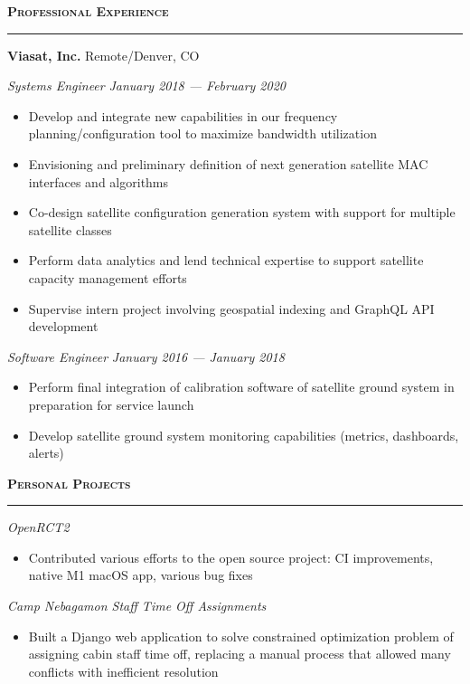 \documentclass[10pt,letterpaper,hidelinks]{article}
\newcommand*{\seriffont}{\fontfamily{yv1}\selectfont}
\newenvironment{resumeSection}[1]{
{\Large \textbf{\textsc{#1}}}
\vspace{0.25em}
\hrule
\vspace{0.5em}
}{

}
\newenvironment{employer}[2]{
{\large \textbf{#1} \hfill #2} \newline
}{
\vspace{0.5em}
}
\newenvironment{position}[2]{
{\large \emph{#1} \hfill \emph{#2}}
\seriffont 
\begin{itemize}[noitemsep,topsep=0pt]
}{
\end{itemize}
\vspace{0.5em}
}
\begin{document}
\begin{resumeSection}{Professional Experience}
\begin{employer}{Viasat, Inc.}{Remote/Denver, CO}
\begin{position}{Systems Engineer}{January 2018 --- February 2020}
\item Develop and integrate new capabilities in our frequency planning/configuration tool to maximize bandwidth utilization
\item Envisioning and preliminary definition of next generation satellite MAC interfaces and algorithms
\item Co-design satellite configuration generation system with support for multiple satellite classes
\item Perform data analytics and lend technical expertise to support satellite capacity management efforts
\item Supervise intern project involving geospatial indexing and GraphQL API development
\end{position}
\begin{position}{Software Engineer}{January 2016 --- January 2018}
\item Perform final integration of calibration software of satellite ground system in preparation for service launch
\item Develop satellite ground system monitoring capabilities (metrics, dashboards, alerts)
\end{position}
\end{employer}
\end{resumeSection}

\begin{resumeSection}{Personal Projects}
\begin{position}{OpenRCT2}{}
\item Contributed various efforts to the open source project: CI improvements, native M1 macOS app, various bug fixes
\end{position}
\begin{position}{Camp Nebagamon Staff Time Off Assignments}{}
\item Built a Django web application to solve constrained optimization problem of assigning cabin staff time off, replacing a manual process that allowed many conflicts with inefficient resolution
\end{position}
\end{resumeSection}
\end{document}
